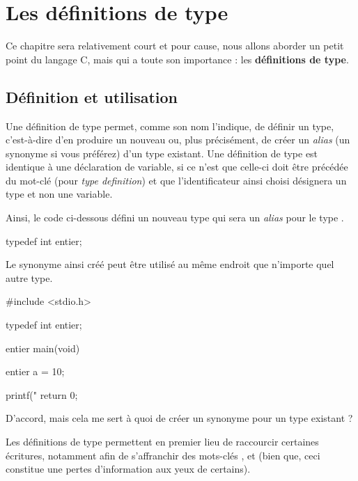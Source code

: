 \chapter{Les définitions de type}
\label{les-definitions-de-type}

Ce chapitre sera relativement court et pour cause, nous allons aborder 
  un petit point du langage C, mais qui a toute son importance : les 
  \textbf{définitions de type}.
  
\section{Définition et utilisation }
\label{definition-et-utilisation}

  Une définition de type permet, comme son nom l'indique, de définir un
  type, c'est-à-dire d'en produire un nouveau ou, plus précisément, de
  créer un \emph{alias} (un synonyme si vous préférez) d'un type
  existant. Une définition de type est identique à une déclaration de
  variable, si ce n'est que celle-ci doit être précédée du mot-clé
   (pour \emph{type definition}) et que l'identificateur
  ainsi choisi désignera un type et non une variable.


Ainsi, le code ci-dessous défini un nouveau type  qui
sera un \emph{alias} pour le type .

\begin{C}
typedef int entier;
\end{C}

Le synonyme ainsi créé peut être utilisé au même endroit que n'importe
quel autre type.

\begin{C}
#include <stdio.h>

typedef int entier;


entier main(void)
{
    entier a = 10;

    printf("%
    return 0;
}
\end{C}

\begin{questionbox}
  D'accord, mais cela me sert à quoi de
créer un synonyme pour un type existant ?
\end{questionbox}

Les définitions de type permettent en premier lieu de raccourcir
certaines écritures, notamment afin de s'affranchir des mots-clés
,  et  (bien que, ceci
constitue une pertes d'information aux yeux de certains).


